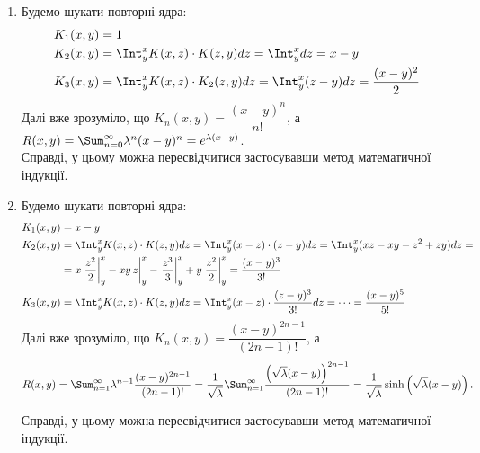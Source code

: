 \begin{solution}
    \begin{enumerate}
        \item Будемо шукати повторні ядра:
        \begin{equation*}
            \begin{split}
                K_1(x, y) &= 1 \\
                K_2(x, y) &= \Int_y^x K(x, z) \cdot K(z, y) dz = \Int_y^x dz = x - y \\
                K_3(x, y) &= \Int_y^x K(x, z) \cdot K_2(z, y) dz = \Int_y^x (z - y) dz = \dfrac{(x - y)^2}{2} 
            \end{split}
        \end{equation*}
        Далі вже зрозуміло, що $K_n(x, y) = \dfrac{(x - y)^n}{n!}$, а $R(x, y) = \Sum_{n=0}^\infty \lambda^n (x-y)^n = e^{\lambda(x - y)}$.\\
        
        Справді, у цьому можна пересвідчитися застосувавши метод математичної індукції.
        \item Будемо шукати повторні ядра:
        \begin{equation*}
            \begin{split}
                K_1(x, y) &= x - y \\
                K_2(x, y) &= \Int_y^x K(x, z) \cdot K(z, y) dz = \Int_y^x (x - z) \cdot (z - y) dz = \Int_y^x (xz - xy - z^2 + zy) dz = \\
                &= x\left.\dfrac{z^2}{2}\right|_y^x - xy\, z\bigg|_y^x - \left.\dfrac{z^3}{3}\right|_y^x + y\left.\dfrac{z^2}{2}\right|_y^x = \dfrac{(x-y)^3}{3!} \\
                K_3(x, y) &= \Int_y^x K(x, z) \cdot K(z, y) dz = \Int_y^x (x - z) \cdot \dfrac{(z - y)^3}{3!} dz = \cdots = \dfrac{(x-y)^5}{5!}
            \end{split}
        \end{equation*}
        Далі вже зрозуміло, що $K_n(x, y) = \dfrac{(x - y)^{2n-1}}{(2n-1)!}$, а 
        \[
            R(x, y) = \Sum_{n=1}^\infty \lambda^{n-1}\dfrac{(x - y)^{2n-1}}{(2n-1)!} = \dfrac{1}{\sqrt{\lambda}} \Sum_{n=1}^\infty \dfrac{\left(\sqrt{\lambda}(x - y)\right)^{2n-1}}{(2n-1)!} = \dfrac{1}{\sqrt{\lambda}}\sinh\left(\sqrt{\lambda}(x - y)\right).
        \]
        
        Справді, у цьому можна пересвідчитися застосувавши метод математичної індукції.
    \end{enumerate}
\end{solution}